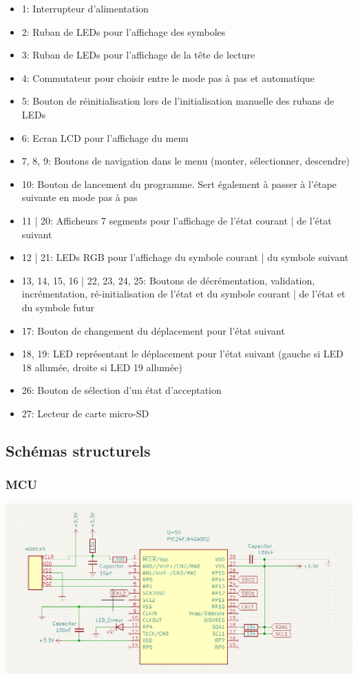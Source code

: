 \documentclass[12pt]{report}
\begin{document}
	\begin{itemize}[label=$-$]
		\item 1: Interrupteur d'alimentation
		\item 2: Ruban de LEDs pour l'affichage des symboles
		\item 3: Ruban de LEDs pour l'affichage de la tête de lecture
		\item 4: Commutateur pour choisir entre le mode pas à pas et automatique
		\item 5: Bouton de réinitialisation lors de l'initialisation manuelle des rubans de LEDs
		\item 6: Ecran LCD pour l'affichage du menu
		\item 7, 8, 9: Boutons de navigation dans le menu (monter, sélectionner, descendre)
		\item 10: Bouton de lancement du programme. Sert également à passer à l'étape suivante en mode pas à pas
		\item 11 | 20: Afficheurs 7 segments pour l'affichage de l'état courant | de l'état suivant
		\item 12 | 21: LEDs RGB pour l'affichage du symbole courant | du symbole suivant
		\item 13, 14, 15, 16 | 22, 23, 24, 25: Boutons de décrémentation, validation, incrémentation, ré-initialisation de l'état et du symbole courant | de l'état et du symbole futur
		\item 17: Bouton de changement du déplacement pour l'état suivant
		\item 18, 19: LED représentant le déplacement pour l'état suivant (gauche si LED 18 allumée, droite si LED 19 allumée)
		\item 26: Bouton de sélection d'un état d'acceptation
		\item 27: Lecteur de carte micro-SD
	\end{itemize}
	\subsection{Schémas structurels}
	\subsubsection{MCU}
	\includegraphics[width=\textwidth]{img/st_mcu}
\end{document}
